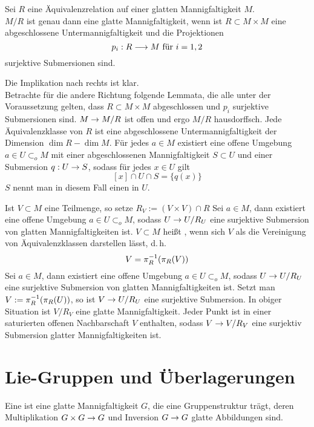 \documentclass{book}
\begin{document}
Sei $R$ eine Äquivalenzrelation auf einer glatten Mannigfaltigkeit $M$.\\
$M/R$ ist genau dann eine glatte Mannigfaltigkeit, wenn ist $R\subset M \times M$ eine abgeschlossene Untermannigfaltigkeit und die Projektionen
\[ p_i : R \overset{}{\longrightarrow} M \text{ für }i=1,2 \]
surjektive Submersionen sind.
\begin{Beweis}{}
Die Implikation nach rechts ist klar.\\
Betrachte für die andere Richtung folgende Lemmata, die alle unter der Voraussetzung gelten, dass $R \subset M\times M$ abgeschlossen und $p_i$ surjektive Submersionen sind.
$M \overset{}{\rightarrow} M/R$ ist offen und ergo $M/R$ hausdorffsch.
Jede Äquivalenzklasse von $R$ ist eine abgeschlossene Untermannigfaltigkeit der Dimension $\dim R - \dim M$.
Für jedes $a \in M$ existiert eine offene Umgebung $a \in U \subset_o M$ mit einer abgeschlossenen Mannigfaltigkeit $S \subset U$ und einer Submersion $q:U \overset{}{\rightarrow} S$, sodass für jedes $x \in U$ gilt
\[ [x]\cap U \cap S = \{q(x)\} \]
$S$ nennt man in diesem Fall einen  in $U$.

\Def{}
Ist $V \subset M$ eine Teilmenge, so setze $R_V := (V \times V)\cap R$
\Kor{}
Sei $a\in M$, dann existiert eine offene Umgebung $a \in U \subset_oM$, sodass $U \overset{}{\rightarrow} U/R_U$ eine surjektive Submersion von glatten Mannigfaltigkeiten ist.
\Def{}
$V\subset M$ heißt , wenn sich $V$ als die Vereinigung von Äquivalenzklassen darstellen lässt, d.\,h.
\[ V = \pi_R^{-1} (\pi_R(V)) \]
Sei $a \in M$, dann existiert eine offene Umgebung $a \in U \subset_oM$, sodass $U \overset{}{\rightarrow} U/R_U$ eine surjektive Submersion von glatten Mannigfaltigkeiten ist. Setzt man $V := \pi_R^{-1} (\pi_R(U))$, so ist $V \overset{}{\rightarrow} U/R_U$ eine surjektive Submersion.
\Kor{}
In obiger Situation ist $V/R_V$ eine glatte Mannigfaltigkeit.
\Kor{}
Jeder Punkt ist in einer saturierten offenen Nachbarschaft $V$ enthalten, sodass $V \overset{}{\rightarrow} V/R_V$ eine surjektiv Submersion glatter Mannigfaltigkeiten ist.
\end{Beweis}

\newpage
\section{Lie-Gruppen und Überlagerungen}
Eine  ist eine glatte Mannigfaltigkeit $G$, die eine Gruppenstruktur trägt, deren Multiplikation $G \times G \overset{}{\rightarrow} G$ und Inversion $G \overset{}{\rightarrow} G$ glatte Abbildungen sind.
\end{document}
